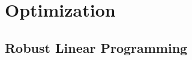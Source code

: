 









\chapter{Optimization}
\label{chp:Optimization}



\section{Robust Linear Programming}
\label{sec:RobustLinearProgramming}


